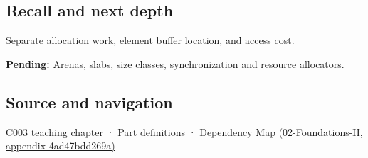 \subsection{Recall and next depth}\label{recall-and-next-depth}

Separate allocation work, element buffer location, and access cost.

\textbf{Pending:} Arenas, slabs, size classes, synchronization and resource allocators.

\subsection{Source and navigation}\label{source-and-navigation}

\href{Continuous\%20Notes/Computing\%20Foundations\%20-\%20From\%20Bits\%20to\%20C++\%20and\%20Systems\%20APIs\#Where\%20the\%20bytes\%20live}{C003 teaching chapter} · \hyperref[appendix-fd090d982a15]{Part definitions} · \href{}{Dependency Map (02-Foundations-II, appendix-4ad47bdd269a)}
